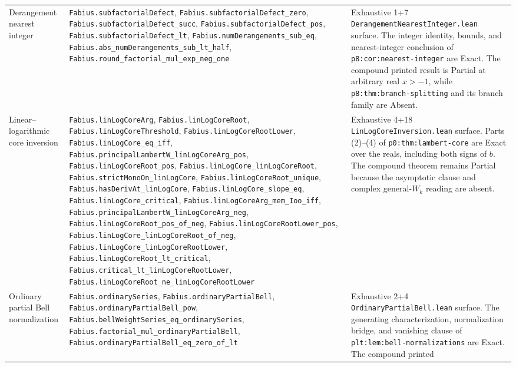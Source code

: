 \documentclass[11pt,oneside]{article}
\theoremstyle{definition}
\theoremstyle{remark}
\begin{document}
\begin{longtable}{@{}>{\raggedright\arraybackslash}p{} >{\raggedright\arraybackslash}p{} >{\raggedright\arraybackslash}p{}@{}}
Derangement nearest integer &
\nolinkurl{Fabius.subfactorialDefect},
\nolinkurl{Fabius.subfactorialDefect_zero},
\nolinkurl{Fabius.subfactorialDefect_succ},
\nolinkurl{Fabius.subfactorialDefect_pos},
\nolinkurl{Fabius.subfactorialDefect_lt},
\nolinkurl{Fabius.numDerangements_sub_eq},
\nolinkurl{Fabius.abs_numDerangements_sub_lt_half},
\nolinkurl{Fabius.round_factorial_mul_exp_neg_one} & Exhaustive 1+7
\nolinkurl{DerangementNearestInteger.lean} surface.  The integer identity,
bounds, and nearest-integer conclusion of
\nolinkurl{p8:cor:nearest-integer} are Exact.  The compound printed result is
Partial at arbitrary real \(x>-1\), while
\nolinkurl{p8:thm:branch-splitting} and its branch family are Absent. \\
Linear--logarithmic core inversion &
\nolinkurl{Fabius.linLogCoreArg}, \nolinkurl{Fabius.linLogCoreRoot},
\nolinkurl{Fabius.linLogCoreThreshold},
\nolinkurl{Fabius.linLogCoreRootLower},
\nolinkurl{Fabius.linLogCore_eq_iff},
\nolinkurl{Fabius.principalLambertW_linLogCoreArg_pos},
\nolinkurl{Fabius.linLogCoreRoot_pos},
\nolinkurl{Fabius.linLogCore_linLogCoreRoot},
\nolinkurl{Fabius.strictMonoOn_linLogCore},
\nolinkurl{Fabius.linLogCoreRoot_unique},
\nolinkurl{Fabius.hasDerivAt_linLogCore},
\nolinkurl{Fabius.linLogCore_slope_eq},
\nolinkurl{Fabius.linLogCore_critical},
\nolinkurl{Fabius.linLogCoreArg_mem_Ioo_iff},
\nolinkurl{Fabius.principalLambertW_linLogCoreArg_neg},
\nolinkurl{Fabius.linLogCoreRoot_pos_of_neg},
\nolinkurl{Fabius.linLogCoreRootLower_pos},
\nolinkurl{Fabius.linLogCore_linLogCoreRoot_of_neg},
\nolinkurl{Fabius.linLogCore_linLogCoreRootLower},
\nolinkurl{Fabius.linLogCoreRoot_lt_critical},
\nolinkurl{Fabius.critical_lt_linLogCoreRootLower},
\nolinkurl{Fabius.linLogCoreRoot_ne_linLogCoreRootLower} & Exhaustive 4+18
\nolinkurl{LinLogCoreInversion.lean} surface.  Parts (2)--(4) of
\nolinkurl{p0:thm:lambert-core} are Exact over the reals, including both
signs of \(b\).  The compound theorem remains Partial because the asymptotic
clause and complex general-\(W_k\) reading are absent. \\
Ordinary partial Bell normalization &
\nolinkurl{Fabius.ordinarySeries},
\nolinkurl{Fabius.ordinaryPartialBell},
\nolinkurl{Fabius.ordinaryPartialBell_pow},
\nolinkurl{Fabius.bellWeightSeries_eq_ordinarySeries},
\nolinkurl{Fabius.factorial_mul_ordinaryPartialBell},
\nolinkurl{Fabius.ordinaryPartialBell_eq_zero_of_lt} & Exhaustive 2+4
\nolinkurl{OrdinaryPartialBell.lean} surface.  The generating
characterization, normalization bridge, and vanishing clause of
\nolinkurl{plt:lem:bell-normalizations} are Exact.  The compound printed

\end{longtable}
\end{document}

